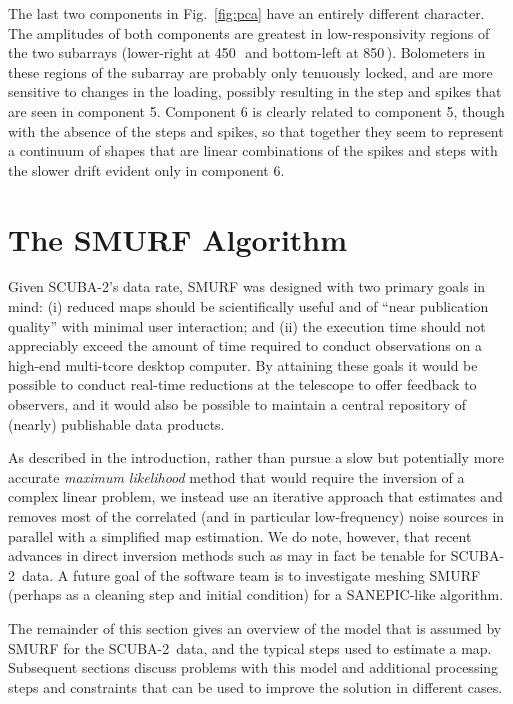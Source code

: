 \documentclass[useAMS,usenatbib,nofootinbib]{mn2e}
\newcommand{\scuba}{SCUBA-2}
\begin{document}
The last two components in Fig.~\ref{fig:pca} have an entirely
different character. The amplitudes of both components are greatest in
low-responsivity regions of the two subarrays (lower-right at
450\,\micron\ and bottom-left at 850\,\micron). Bolometers in these
regions of the subarray are probably only tenuously locked, and are
more sensitive to changes in the loading, possibly resulting in the
step and spikes that are seen in component 5. Component 6 is clearly
related to component 5, though with the absence of the steps and
spikes, so that together they seem to represent a continuum of shapes
that are linear combinations of the spikes and steps with the slower
drift evident only in component 6.

\section{The SMURF Algorithm}
\label{sec:algorithm}

Given \scuba's data rate, SMURF was designed with two primary goals in
mind: (i) reduced maps should be scientifically useful and of ``near
publication quality'' with minimal user interaction; and (ii) the
execution time should not appreciably exceed the amount of time
required to conduct observations on a high-end multi-tcore desktop
computer. By attaining these goals it would be possible to conduct
real-time reductions at the telescope to offer feedback to observers,
and it would also be possible to maintain a central repository of
(nearly) publishable data products.

As described in the introduction, rather than pursue a slow but
potentially more accurate \emph{maximum likelihood} method that would
require the inversion of a complex linear problem, we instead use an
iterative approach that estimates and removes most of the correlated
(and in particular low-frequency) noise sources in parallel with a
simplified map estimation. We do note, however, that recent advances
in direct inversion methods such as \citet{patanchon2008} may in fact
be tenable for \scuba\ data. A future goal of the software team is to
investigate meshing SMURF (perhaps as a cleaning step and initial
condition) for a SANEPIC-like algorithm.

The remainder of this section gives an overview of the model that is
assumed by SMURF for the \scuba\ data, and the typical steps used to
estimate a map. Subsequent sections discuss problems with this model
and additional processing steps and constraints that can be used to
improve the solution in different cases.
\end{document}
